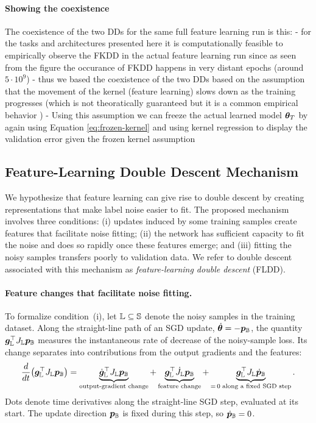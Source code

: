 \documentclass[10pt]{article} %
\begin{document}
\paragraph{Showing the coexistence} The coexistence of the two DDs for the same full feature learning run is this:
- for the tasks and architectures presented here it is computationally feasible to empirically observe the FKDD in the actual feature learning run since as seen from the figure the occurance of FKDD happens in very distant epochs (around $5 \cdot 10^{9}$)
- thus we based the coexistence of the two DDs based on the assumption that the movement of the kernel (feature learning) slows down as the training progresses (which is not theoratically guaranteed but it is a common empirical behavior \citep{atanasov2021neuralnetworkskernellearners})
- Using this assumption we can freeze the actual learned model ${\bm{\theta}}_T$ by again using Equation \ref{eq:frozen-kernel} and using kernel regression to display the validation error given the frozen kernel assumption

\subsection{Feature-Learning Double Descent Mechanism}
\label{sec:fldd-mechanism}

We hypothesize that feature learning can give rise to double descent by
creating representations that make label noise easier to fit. The proposed
mechanism involves three conditions: (i) updates induced by some training
samples create features that facilitate noise fitting; (ii) the network
has sufficient capacity to fit the noise and does so rapidly once these
features emerge; and (iii) fitting the noisy samples transfers poorly to
validation data. We refer to double descent associated with this mechanism
as \emph{feature-learning double descent} (FLDD).

\paragraph{Feature changes that facilitate noise fitting.}
To formalize condition~(i), let ${\mathbb{L}}\subseteq{\mathbb{S}}$ denote the noisy samples
in the training dataset. Along the straight-line path of an SGD
update, $\dot{{\bm{\theta}}}=-{\bm{p}}_{\mathbb{B}}$, the quantity
${\bm{g}}_{\mathbb{L}}^\top J_{\mathbb{L}}{\bm{p}}_{\mathbb{B}}$ measures the instantaneous rate of decrease
of the noisy-sample loss. Its change separates into contributions from
the output gradients and the features:
\begin{equation}
    \frac{d}{dt}\bigl({\bm{g}}_{\mathbb{L}}^\top J_{\mathbb{L}}{\bm{p}}_{\mathbb{B}}\bigr)
    = \underbrace{\dot{{\bm{g}}}_{\mathbb{L}}^\top J_{\mathbb{L}}{\bm{p}}_{\mathbb{B}}}_{\text{output-gradient change}}
    + \underbrace{{\bm{g}}_{\mathbb{L}}^\top\dot{J}_{\mathbb{L}}{\bm{p}}_{\mathbb{B}}}_{\text{feature change}}
    + \underbrace{{\bm{g}}_{\mathbb{L}}^\top J_{\mathbb{L}}\dot{{\bm{p}}}_{\mathbb{B}}}_{=\,0\;\text{along a fixed SGD step}}.
\end{equation}
Dots denote time derivatives along the straight-line SGD step, evaluated
at its start. The update direction ${\bm{p}}_{\mathbb{B}}$ is fixed during this step,
so $\dot{{\bm{p}}}_{\mathbb{B}}=0$.
\end{document}
